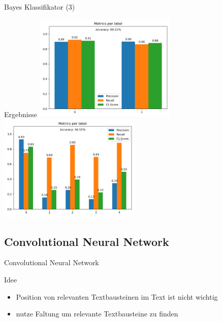 \documentclass[aspectratio=169]{beamer} %
\begin{document}
\begin{frame}{Bayes Klassifikator (3)}
    \begin{block}{Ergebnisse}
        \includegraphics[width=6.8cm]{figures/evaluation_nbb.png} \includegraphics[width=6.8cm]{figures/evaluation_nbm.png}
    \end{block}
\end{frame}

\subsection{Convolutional Neural Network}

\begin{frame}{Convolutional Neural Network}
    \begin{block}{Idee}
    \begin{itemize}
        \item Position von relevanten Textbausteinen im Text ist nicht wichtig

        \item nutze Faltung um relevante Textbausteine zu finden
        \begin{figure}
            \centering
            
        \end{figure}
    \end{itemize}
    \end{block}
\end{frame}
\end{document}
